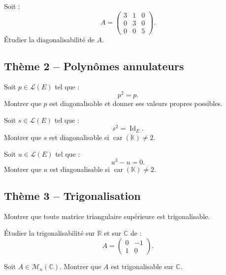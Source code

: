 \documentclass[11pt,a4paper]{article}
\newcommand{\K}{\mathbb K}
\newcommand{\R}{\mathbb R}
\newcommand{\C}{\mathbb C}
\newcommand{\M}{\mathcal M}
\newcommand{\Lcal}{\mathcal L}
\newcommand{\Id}{\operatorname{Id}}
\begin{document}
\begin{exercicebox}[4]
Soit :
\[
A=
\begin{pmatrix}
3&1&0\\
0&3&0\\
0&0&5
\end{pmatrix}.
\]
Étudier la diagonalisabilité de \(A\).
\end{exercicebox}

\subsection*{Thème 2 -- Polynômes annulateurs}

\begin{exercicebox}[5]
Soit \(p\in\Lcal(E)\) tel que :
\[
p^2=p.
\]
Montrer que \(p\) est diagonalisable et donner ses valeurs propres possibles.
\end{exercicebox}

\begin{exercicebox}[6]
Soit \(s\in\Lcal(E)\) tel que :
\[
s^2=\Id_E.
\]
Montrer que \(s\) est diagonalisable si \(\operatorname{car}(\K)\neq2\).
\end{exercicebox}

\begin{exercicebox}[7]
Soit \(u\in\Lcal(E)\) tel que :
\[
u^3-u=0.
\]
Montrer que \(u\) est diagonalisable si \(\operatorname{car}(\K)\neq2\).
\end{exercicebox}

\subsection*{Thème 3 -- Trigonalisation}

\begin{exercicebox}[8]
Montrer que toute matrice triangulaire supérieure est trigonalisable.
\end{exercicebox}

\begin{exercicebox}[9]
Étudier la trigonalisabilité sur \(\R\) et sur \(\C\) de :
\[
A=
\begin{pmatrix}
0&-1\\
1&0
\end{pmatrix}.
\]
\end{exercicebox}

\begin{exercicebox}[10]
Soit \(A\in\M_n(\C)\).  
Montrer que \(A\) est trigonalisable sur \(\C\).
\end{exercicebox}
\end{document}
